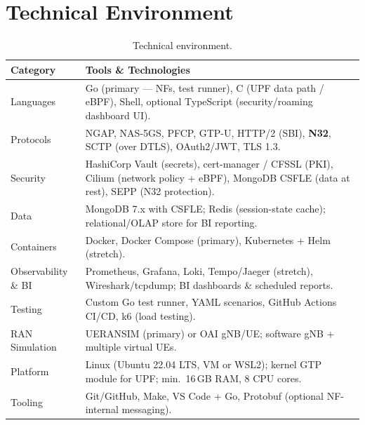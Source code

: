 \documentclass[11pt,a4paper]{report}
\begin{document}
\section{Technical Environment}
\begin{table}[h]
\centering
\footnotesize
\renewcommand{\arraystretch}{1.25}
\begin{tabularx}{\linewidth}{@{}l X@{}}
\toprule
\textbf{Category} & \textbf{Tools \& Technologies}\\
\midrule
Languages     & Go (primary --- NFs, test runner), C (UPF data path / eBPF), Shell, optional TypeScript (security/roaming dashboard UI).\\
Protocols     & NGAP, NAS-5GS, PFCP, GTP-U, HTTP/2 (SBI), \textbf{N32}, SCTP (over DTLS), OAuth2/JWT, TLS 1.3.\\
Security      & HashiCorp Vault (secrets), cert-manager / CFSSL (PKI), Cilium (network policy + eBPF), MongoDB CSFLE (data at rest), SEPP (N32 protection).\\
Data          & MongoDB 7.x with CSFLE; Redis (session-state cache); relational/OLAP store for BI reporting.\\
Containers    & Docker, Docker Compose (primary), Kubernetes + Helm (stretch).\\
Observability \& BI & Prometheus, Grafana, Loki, Tempo/Jaeger (stretch), Wireshark/tcpdump; BI dashboards \& scheduled reports.\\
Testing       & Custom Go test runner, YAML scenarios, GitHub Actions CI/CD, k6 (load testing).\\
RAN Simulation& UERANSIM (primary) or OAI gNB/UE; software gNB + multiple virtual UEs.\\
Platform      & Linux (Ubuntu 22.04 LTS, VM or WSL2); kernel GTP module for UPF; min.\ 16\,GB RAM, 8 CPU cores.\\
Tooling       & Git/GitHub, Make, VS Code + Go, Protobuf (optional NF-internal messaging).\\
\bottomrule
\end{tabularx}
\caption{Technical environment.}
\label{tab:env}
\end{table}

\end{document}
